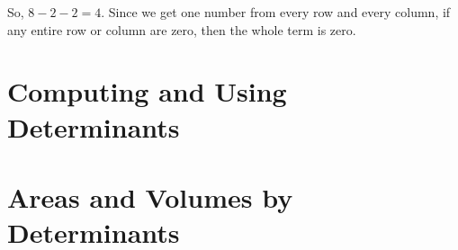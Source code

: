So, \(8 -2 -2 = 4\). Since we get one number from every row and every column, if any entire row or column are zero, then the whole term is zero. 

\section{Computing and Using Determinants}



\section{Areas and Volumes by Determinants}


